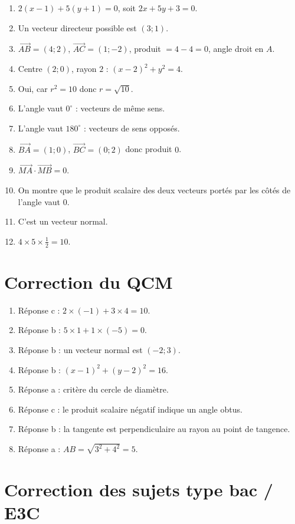 \documentclass[11pt,a4paper]{article}
\newcounter{reponse}
\newenvironment{blocreponses}[1]{%
  \begin{tcolorbox}[enhanced,breakable,colback=bleuclair,colframe=bleufonce,boxrule=0.6pt,arc=2mm,left=2mm,right=2mm,top=2mm,bottom=1.5mm,title={\bfseries #1},coltitle=white,colbacktitle=bleufonce,before skip=3mm,after skip=3mm, fontupper=\large]
  \large
  \begin{enumerate}[leftmargin=*,label=\textbf{\arabic*.},itemsep=0.42em,topsep=0.5em]
  \setcounter{enumi}{\value{reponse}}
}{%
  \setcounter{reponse}{\value{enumi}}
  \end{enumerate}
  \end{tcolorbox}
}
\begin{document}
\begin{blocreponses}{Questions flash 25 à 36}
\item $2(x-1)+5(y+1)=0$, soit $2x+5y+3=0$.
\item Un vecteur directeur possible est $(3;1)$.
\item $\overrightarrow{AB}=(4;2)$, $\overrightarrow{AC}=(1;-2)$, produit $=4-4=0$, angle droit en $A$.
\item Centre $(2;0)$, rayon $2$ : $(x-2)^2+y^2=4$.
\item Oui, car $r^2=10$ donc $r=\sqrt{10}$.
\item L’angle vaut $0^\circ$ : vecteurs de même sens.
\item L’angle vaut $180^\circ$ : vecteurs de sens opposés.
\item $\overrightarrow{BA}=(1;0)$, $\overrightarrow{BC}=(0;2)$ donc produit $0$.
\item $\overrightarrow{MA}\cdot\overrightarrow{MB}=0$.
\item On montre que le produit scalaire des deux vecteurs portés par les côtés de l’angle vaut $0$.
\item C’est un vecteur normal.
\item $4\times5\times \frac12=10$.
\end{blocreponses}

\section{Correction du QCM}
\begin{enumerate}
\item Réponse c : $2\times(-1)+3\times4=10$.
\item Réponse b : $5\times1+1\times(-5)=0$.
\item Réponse b : un vecteur normal est $(-2;3)$.
\item Réponse b : $(x-1)^2+(y-2)^2=16$.
\item Réponse a : critère du cercle de diamètre.
\item Réponse c : le produit scalaire négatif indique un angle obtus.
\item Réponse b : la tangente est perpendiculaire au rayon au point de tangence.
\item Réponse a : $AB=\sqrt{3^2+4^2}=5$.
\end{enumerate}

\section{Correction des sujets type bac / E3C}
\end{document}
